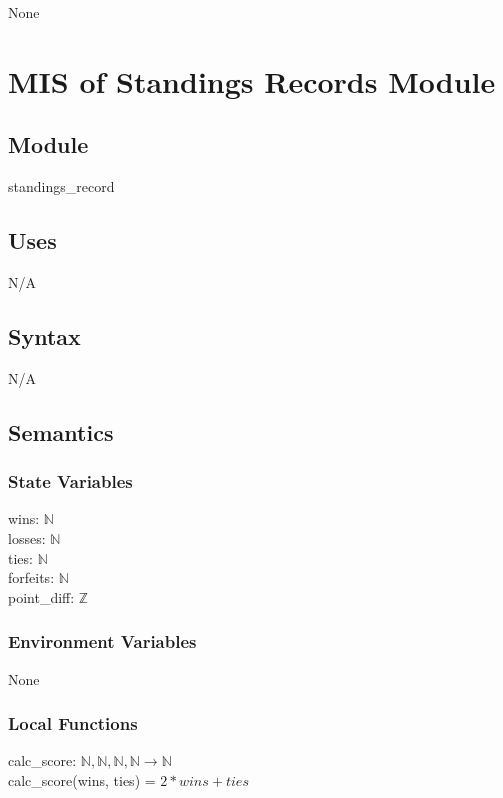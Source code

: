 \documentclass[12pt, titlepage]{article}
\begin{document}
None

\newpage

\section{MIS of Standings Records Module} \label{mST}

\subsection{Module}

standings\_record

\subsection{Uses}

N/A

\subsection{Syntax}

N/A

\subsection{Semantics}

\subsubsection{State Variables}

wins: $\mathbb{N}$\\
losses: $\mathbb{N}$\\ 
ties: $\mathbb{N}$\\
forfeits: $\mathbb{N}$\\
point\_diff: $\mathbb{Z}$

\subsubsection{Environment Variables}

None

\subsubsection{Local Functions}

calc\_score: $\mathbb{N}, \mathbb{N}, \mathbb{N}, \mathbb{N} \rightarrow \mathbb{N}$\\
calc\_score(wins, ties) = $2*wins + ties$
\end{document}
